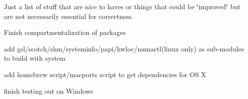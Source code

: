 Just a list of stuff that are nice to haves or things that could be \char`\"{}improved\char`\"{} but are not necessarily essential for correctness.


\begin{DoxyItemize}
\item Finish compartmentalization of packages
\item add gsl/scotch/shm/systeminfo/papi/hwloc/numactl(linux only) as sub-\/modules to build with system
\item add homebrew script/macports script to get dependencies for O\+S X
\item finish testing out on Windows 
\end{DoxyItemize}